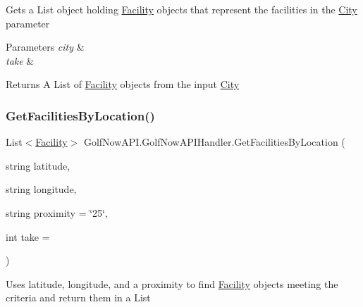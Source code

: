 Gets a List object holding \mbox{\hyperlink{class_golf_now_a_p_i_1_1_facility}{Facility}} objects that represent the facilities in the \mbox{\hyperlink{class_golf_now_a_p_i_1_1_city}{City}} parameter 


\begin{DoxyParams}{Parameters}
{\em city} & \\
\hline
{\em take} & \\
\hline
\end{DoxyParams}
\begin{DoxyReturn}{Returns}
A List of \mbox{\hyperlink{class_golf_now_a_p_i_1_1_facility}{Facility}} objects from the input \mbox{\hyperlink{class_golf_now_a_p_i_1_1_city}{City}}
\end{DoxyReturn}
\mbox{\label{class_golf_now_a_p_i_1_1_golf_now_a_p_i_handler_a98f9a1d8ee47db7d33b6b76ccfc8cb5e}} 
\subsubsection{\texorpdfstring{GetFacilitiesByLocation()}{GetFacilitiesByLocation()}}
{\footnotesize\ttfamily List$<$\mbox{\hyperlink{class_golf_now_a_p_i_1_1_facility}{Facility}}$>$ Golf\+Now\+A\+P\+I.\+Golf\+Now\+A\+P\+I\+Handler.\+Get\+Facilities\+By\+Location (\begin{DoxyParamCaption}\item[{string}]{latitude,  }\item[{string}]{longitude,  }\item[{string}]{proximity = {\ttfamily \char`\"{}25\char`\"{}},  }\item[{int}]{take = {} }\end{DoxyParamCaption})\hspace{0.3cm}{\ttfamily [inline]}}



Uses latitude, longitude, and a proximity to find \mbox{\hyperlink{class_golf_now_a_p_i_1_1_facility}{Facility}} objects meeting the criteria and return them in a List 


